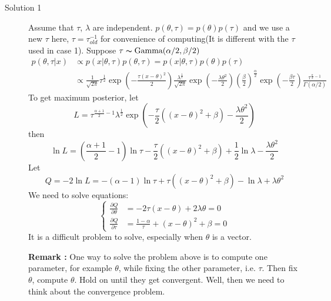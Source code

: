 \documentclass[11pt]{article}
\begin{document}
\begin{description}
\begin{description}
    \item[Solution 1]Assume that $\tau$, $\lambda$ are independent. $p(\theta, \tau) = p(\theta)p(\tau)$
    and we use a new $\tau$ here, $\tau = \tau_{old}^{-1}$ for convenience of computing(It is different with the $\tau$ used in case 1). Suppose $\tau \thicksim \mbox{Gamma}(\alpha/2, \beta/2)$
    \begin{eqnarray*}
    p(\theta, \tau|x) &\propto p(x| \theta, \tau) p(\theta, \tau) = p(x|\theta, \tau)p(\theta)p(\tau)
    \nonumber\\
    &\propto \frac{1}{\sqrt{2\pi}}\tau^\frac{1}{2}\exp(-\frac{\tau(x-\theta)^2}{2})\frac{\lambda^\frac{1}{2}}{\sqrt{2\pi}}
    \exp(-\frac{\lambda\theta^2}{2})(\frac{\beta}{2})^\frac{\alpha}{2}\exp(-\frac{\beta \tau}{2})\frac{\tau ^{\frac{\alpha}{2} - 1}}{\Gamma(\alpha/2)}
    \end{eqnarray*}
    To get maximum posterior, let
    $$L = \tau^{\frac{\alpha+1}{2}-1}\lambda^\frac{1}{2}\exp(-\frac{\tau}{2}((x-\theta)^2+\beta)-\frac{\lambda\theta^2}{2})$$
    then
    $$\ln L = (\frac{\alpha+1}{2}-1)\ln\tau - \frac{\tau}{2}((x-\theta)^2+\beta) + \frac{1}{2}\ln\lambda -\frac{\lambda\theta^2}{2}$$
    Let
    $$Q = -2\ln L = -(\alpha - 1)\ln\tau + \tau((x-\theta)^2+\beta) - \ln\lambda + \lambda\theta^2$$
    We need to solve equations:
    \begin{equation*}
      \begin{cases}
        \frac{\partial Q}{\partial\theta} &= -2\tau(x-\theta) + 2\lambda\theta = 0 \\
        \frac{\partial Q}{\partial\tau} &= \frac{1-\alpha}{\tau} + (x -\theta)^2 + \beta = 0
      \end{cases}
    \end{equation*}
It is a difficult problem to solve, especially when $\theta$ is a vector.

\textbf{Remark :} One way to solve the problem above is to compute one parameter, for example $\theta$, while fixing the other parameter, i.e. $\tau$. Then fix $\theta$, compute $\theta$. Hold on until they get convergent. Well, then we need to think about the convergence problem.


\end{description}
\end{description}
\end{document}
